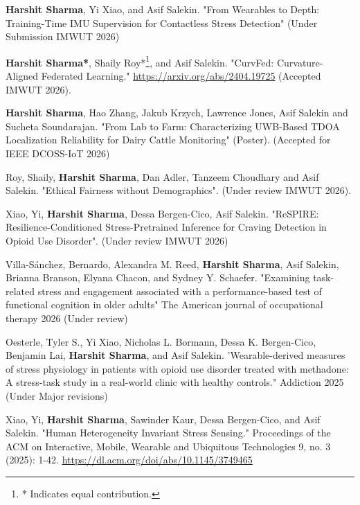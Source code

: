 \documentclass[a4paper,11pt]{article}
\begin{document}
\begin{bibenum}

\item \textbf{Harshit Sharma}, Yi Xiao, and Asif Salekin. "From Wearables to Depth: Training-Time IMU Supervision for Contactless Stress Detection" (Under Submission IMWUT 2026)

\item \textbf{Harshit Sharma*}, Shaily Roy*\footnote{* Indicates equal contribution.}, and Asif Salekin. "CurvFed: Curvature-Aligned Federated Learning." \url{https://arxiv.org/abs/2404.19725} (Accepted IMWUT 2026).

\item \textbf{Harshit Sharma}, Hao Zhang, Jakub Krzych, Lawrence Jones, Asif Salekin and Sucheta Soundarajan. "From Lab to Farm: Characterizing UWB-Based TDOA Localization Reliability for Dairy Cattle Monitoring" (Poster). (Accepted for IEEE DCOSS-IoT 2026)   

\item Roy, Shaily, \textbf{Harshit Sharma}, Dan Adler, Tanzeem Choudhary and Asif Salekin. "Ethical Fairness without Demographics". (Under review IMWUT 2026).

\item Xiao, Yi, \textbf{Harshit Sharma}, Dessa Bergen-Cico, Asif Salekin. "ReSPIRE: Resilience-Conditioned Stress-Pretrained Inference for Craving Detection in Opioid Use Disorder". (Under review IMWUT 2026)

\item Villa-Sánchez, Bernardo, Alexandra M. Reed, \textbf{Harshit Sharma}, Asif Salekin, Brianna Branson, Elyana Chacon, and Sydney Y. Schaefer. "Examining task-related stress and engagement associated with a performance-based test of functional cognition in older adults" The American journal of occupational therapy 2026 (Under review)

\item Oesterle, Tyler S., Yi Xiao, Nicholas L. Bormann, Dessa K. Bergen-Cico, Benjamin Lai, \textbf{Harshit Sharma}, and Asif Salekin. 'Wearable-derived measures of stress physiology in patients with opioid use disorder treated with methadone: A stress-task study in a real-world clinic with healthy controls." Addiction 2025 (Under Major revisions)

\item Xiao, Yi, \textbf{Harshit Sharma}, Sawinder Kaur, Dessa Bergen-Cico, and Asif Salekin. "Human Heterogeneity Invariant Stress Sensing." Proceedings of the ACM on Interactive, Mobile, Wearable and Ubiquitous Technologies 9, no. 3 (2025): 1-42. \url{https://dl.acm.org/doi/abs/10.1145/3749465}


\end{bibenum}
\end{document}
